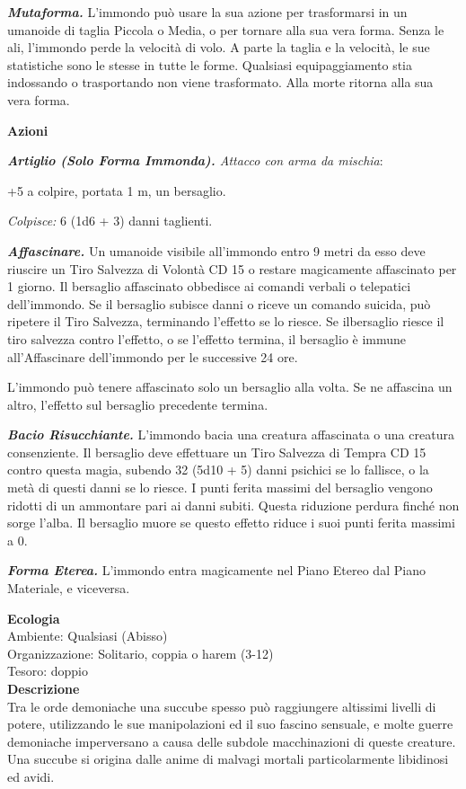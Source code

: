 \begin{multicols}{2}
\emph{\textbf{Mutaforma.}} L'immondo può usare la sua azione per trasformarsi in un umanoide di taglia Piccola o Media, o per tornare alla sua vera forma. Senza le ali, l'immondo perde la velocità di volo. A parte la taglia e la velocità, le sue statistiche sono le stesse in tutte le forme. Qualsiasi equipaggiamento stia indossando o trasportando non viene trasformato. Alla morte ritorna alla sua vera forma.

\textbf{Azioni}

\emph{\textbf{Artiglio (Solo Forma Immonda).} Attacco con arma da
	mischia}:

+5 a colpire, portata 1 m, un bersaglio.

\emph{Colpisce:} 6 (1d6 + 3) danni taglienti.

\emph{\textbf{Affascinare.}} Un umanoide visibile all'immondo entro 9 metri da esso deve riuscire un Tiro Salvezza di Volontà CD 15 o restare magicamente affascinato per 1 giorno. Il bersaglio affascinato obbedisce ai comandi verbali o telepatici dell'immondo. Se il bersaglio subisce danni o riceve un comando suicida, può ripetere il Tiro Salvezza, terminando l'effetto se lo riesce. Se ilbersaglio riesce il tiro  salvezza contro l'effetto, o se l'effetto termina, il bersaglio è immune all'Affascinare dell'immondo per le successive 24 ore.

L'immondo può tenere affascinato solo un bersaglio alla volta. Se ne affascina un altro, l'effetto sul bersaglio precedente termina.

\emph{\textbf{Bacio Risucchiante.}} L'immondo bacia una creatura affascinata o una creatura consenziente. Il bersaglio deve effettuare un Tiro Salvezza di Tempra CD 15 contro questa magia, subendo 32 (5d10 + 5) danni psichici se lo fallisce, o la metà di questi danni se lo riesce. I punti ferita massimi del bersaglio vengono ridotti di un ammontare pari ai danni subiti. Questa riduzione perdura finché non sorge l'alba. Il bersaglio muore se questo effetto riduce i suoi punti ferita massimi a 0.

\emph{\textbf{Forma Eterea.}} L'immondo entra magicamente nel Piano Etereo dal Piano Materiale, e viceversa.

\textbf{Ecologia}\\
Ambiente: Qualsiasi (Abisso)\\
Organizzazione: Solitario, coppia o harem (3-12)\\
Tesoro: doppio\\
\textbf{Descrizione}\\
Tra le orde demoniache una succube spesso può raggiungere altissimi livelli di potere, utilizzando le sue manipolazioni ed il suo fascino sensuale, e molte guerre demoniache imperversano a causa delle subdole macchinazioni di queste creature. Una succube si origina dalle anime di malvagi mortali particolarmente libidinosi ed avidi.\\



\end{multicols}
